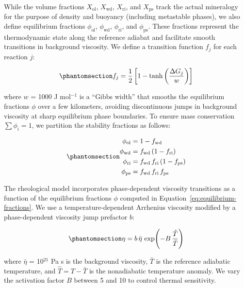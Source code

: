 \documentclass[draft,linenumbers]{agujournal2019}
\begin{document}
While the volume fractions \(X_\mathrm{ol}\), \(X_\mathrm{wd}\),
\(X_\mathrm{ri}\), and \(X_\mathrm{ps}\) track the actual mineralogy for
the purpose of density and buoyancy (including metastable phases), we
also define equilibrium fractions \(\phi_\mathrm{ol}\),
\(\phi_\mathrm{wd}\), \(\phi_\mathrm{ri}\), and \(\phi_\mathrm{ps}\).
These fractions represent the thermodynamic state along the reference
adiabat and facilitate smooth transitions in background viscosity. We
define a transition function \(f_j\) for each reaction \(j\):

\begin{equation}\protect\phantomsection\label{eq:transition-function}{
  f_j = \frac{1}{2} \left[ 1 - \tanh \left( \frac{\Delta G_j}{w} \right) \right]
}\end{equation}

where \(w\) = 1000 J mol\(^{-1}\) is a ``Gibbs width'' that smooths the
equilibrium fractions \(\phi\) over a few kilometers, avoiding
discontinuous jumps in background viscosity at sharp equilibrium phase
boundaries. To ensure mass conservation \(\sum \phi_i = \text{1}\), we
partition the stability fractions as follows:

\begin{equation}\protect\phantomsection\label{eq:equilibrium-fractions}{
  \begin{aligned}
    \phi_\mathrm{ol} &= 1 - f_\mathrm{wd} \\
    \phi_\mathrm{wd} &= f_\mathrm{wd}\, (1 - f_\mathrm{ri}) \\
    \phi_\mathrm{ri} &= f_\mathrm{wd}\, f_\mathrm{ri}\, (1 - f_\mathrm{ps}) \\
    \phi_\mathrm{ps} &= f_\mathrm{wd}\, f_\mathrm{ri}\, f_\mathrm{ps}
  \end{aligned}
}\end{equation}

The rheological model incorporates phase-dependent viscosity transitions
as a function of the equilibrium fractions \(\phi\) computed in
Equation~\ref{eq:equilibrium-fractions}. We use a temperature-dependent
Arrhenius viscosity modified by a phase-dependent viscosity jump
prefactor \(b\):

\begin{equation}\protect\phantomsection\label{eq:rheological-model}{
  \eta = b\, \bar{\eta}\, \exp\!\left(-B\,\frac{\hat{T}}{\bar{T}}\right)
}\end{equation}

where \(\bar{\eta}\) = 10\(^{21}\) Pa s is the background viscosity,
\(\bar{T}\) is the reference adiabatic temperature, and
\(\hat{T} = T - \bar{T}\) is the nonadiabatic temperature anomaly. We
vary the activation factor \(B\) between 5 and 10 to control thermal
sensitivity.
\end{document}

